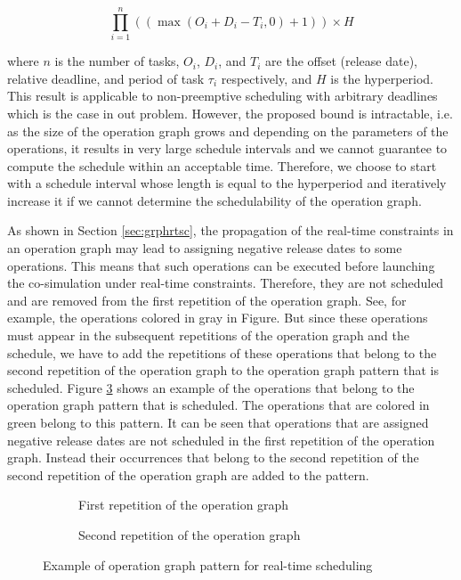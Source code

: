 \begin{equation} 
\prod_{i=1}^n((\max(O_i + D_i - T_i, 0) + 1)) \times H
\end{equation}

where $n$ is the number of tasks, $O_i$, $D_i$, and $T_i$ are the offset (release date), relative deadline, and period of task $\tau_i$ respectively, and $H$ is the hyperperiod. This result is applicable to non-preemptive scheduling with arbitrary deadlines which is the case in out problem. However, the proposed bound is intractable, i.e. as the size of the operation graph grows and depending on the parameters of the operations, it results in very large schedule intervals and we cannot guarantee to compute the schedule within an acceptable time. Therefore, we choose to start with a schedule interval whose length is equal to the hyperperiod and iteratively increase it if we cannot determine the schedulability of the operation graph.


As shown in Section \ref{sec:grphrtsc}, the propagation of the real-time constraints in an operation graph may lead to assigning negative release dates to some operations. This means that such operations can be executed before launching the co-simulation under real-time constraints. Therefore, they are not scheduled and are removed from the first repetition of the operation graph. See, for example, the operations colored in gray in Figure. But since these operations must appear in the subsequent repetitions of the operation graph and the schedule, we have to add the repetitions of these operations that belong to the second repetition of the operation graph to the operation graph pattern that is scheduled. Figure \ref{fig:schedpattern} shows an example of the operations that belong to the operation graph pattern that is scheduled. The operations that are colored in green belong to this pattern. It can be seen that operations that are assigned negative release dates are not scheduled in the first repetition of the operation graph. Instead their occurrences that belong to the second repetition of the second repetition of the operation graph are added to the pattern.

\begin{figure}[phtb]
\centering
\begin{subfigure}{\textwidth}
  \centering
  
  \caption{First repetition of the operation graph}
  \label{fig:rep1}
\end{subfigure}

\begin{subfigure}{\textwidth}
  \centering
  
  \caption{Second repetition of the operation graph}
  \label{fig:rep2}
\end{subfigure}
\caption{Example of operation graph pattern for real-time scheduling}
\label{fig:schedpattern}
\end{figure}

